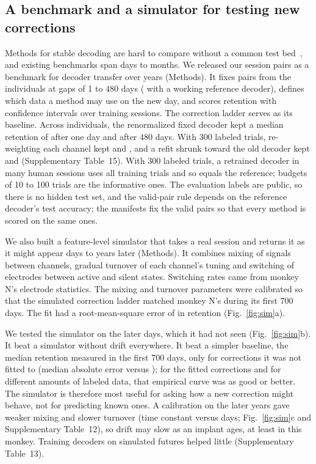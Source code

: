 \documentclass{iopjournal}
\begin{document}
\subsection{A benchmark and a simulator for testing new corrections}

Methods for stable decoding are hard to compare without a common test bed~\cite{pei2021nlb,karpowicz2024falcon,
willett2024b2t}, and existing
benchmarks span days to months. We released our session pairs as a benchmark for decoder transfer over years
(Methods). It fixes  pairs from the  individuals at gaps of 1 to 480 days
( with a working reference decoder), defines which data a method may use on the new day, and scores
retention with confidence intervals over training sessions. The correction ladder serves as its baseline. Across
individuals, the renormalized fixed decoder kept a median retention of  after one day and
 after 480 days. With 300 labeled trials, re-weighting each channel kept  and
, and a refit shrunk toward the old decoder kept  and
 (Supplementary Table~15). With 300 labeled trials, a
retrained decoder in many human sessions uses all training trials and so equals the reference; budgets of 10 to 100
trials are the informative ones. The evaluation labels are public, so there is no hidden test set, and the valid-pair
rule depends on the reference decoder's test accuracy; the manifests fix the valid pairs so that every method is scored
on the same ones.

We also built a feature-level simulator that takes a real session and returns it as it might appear days to years later (Methods). It
combines mixing of signals between channels, gradual turnover of each channel's tuning and switching of electrodes
between active and silent states. Switching rates came from monkey N's electrode statistics. The mixing and turnover
parameters were calibrated so that the simulated correction ladder matched monkey N's during its first 700 days. The
fit had a root-mean-square error of  in retention (Fig.~\ref{fig:sim}a).

We tested the simulator on the later days, which it had not seen (Fig.~\ref{fig:sim}b). It beat a simulator without
drift everywhere. It beat a simpler baseline, the median retention measured in the first 700 days, only for corrections
it was not fitted to (median absolute error  versus ); for the fitted corrections
and for different amounts of labeled data, that empirical curve was as good or better. The
simulator is therefore most useful for asking how a new correction might behave, not for predicting known ones. A
calibration on the later years gave weaker mixing and slower turnover (time constant  versus
 days; Fig.~\ref{fig:sim}c and Supplementary Table~12), so drift may slow as an implant ages, at least in this monkey. Training
decoders on simulated futures helped little (Supplementary Table~13).
\end{document}
